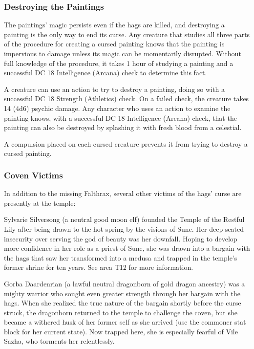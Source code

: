 \documentclass[10pt,a4paper,twoside,bg=print,twocolumn,openany,nodeprecatedcode]{dndbook}
\begin{document}
\subsubsection{Destroying the Paintings}
The paintings' magic persists even if the hags are killed, and destroying a painting is the only way to end its curse. Any creature that studies all three parts of the procedure for creating a cursed painting knows that the painting is impervious to damage unless its magic can be momentarily disrupted. Without full knowledge of the procedure, it takes 1 hour of studying a painting and a successful DC 18 Intelligence (Arcana) check to determine this fact.

A creature can use an action to try to destroy a painting, doing so with a successful DC 18 Strength (Athletics) check. On a failed check, the creature takes 14 (4d6) psychic damage. Any character who uses an action to examine the painting knows, with a successful DC 18 Intelligence (Arcana) check, that the painting can also be destroyed by splashing it with fresh blood from a celestial.

A compulsion placed on each cursed creature prevents it from trying to destroy a cursed painting.

\subsubsection{Coven Victims}
In addition to the missing Falthrax, several other victims of the hags' curse are presently at the temple:

Sylvarie Silversong (a neutral good moon elf) founded the Temple of the Restful Lily after being drawn to the hot spring by the visions of Sune. Her deep-seated insecurity over serving the god of beauty was her downfall. Hoping to develop more confidence in her role as a priest of Sune, she was drawn into a bargain with the hags that saw her transformed into a medusa and trapped in the temple's former shrine for ten years. See area T12 for more information.

Gorba Daardenrian (a lawful neutral dragonborn of gold dragon ancestry) was a mighty warrior who sought even greater strength through her bargain with the hags. When she realized the true nature of the bargain shortly before the curse struck, the dragonborn returned to the temple to challenge the coven, but she became a withered husk of her former self as she arrived (use the commoner stat block for her current state). Now trapped here, she is especially fearful of Vile Sazha, who torments her relentlessly.
\end{document}
